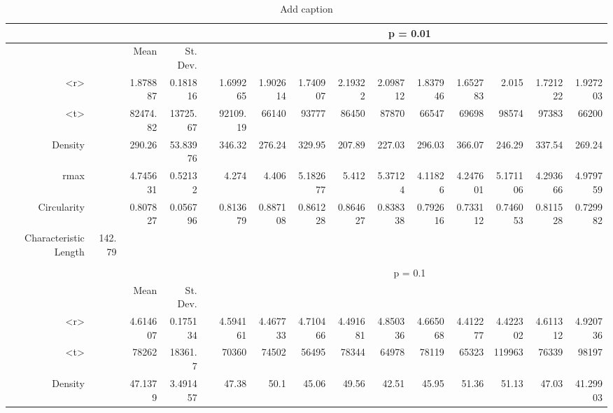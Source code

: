 \begin{table}[htbp]
  \centering
  \caption{Add caption}
    \begin{tabular}{rrrrrrrrrrrrrrr}
    \toprule
          &       &       &       &       & \multicolumn{10}{c}{p = 0.01} \\
    \midrule
          &       & Mean  & St. Dev. &       &       &       &       &       &       &       &       &       &       &  \\
    <r>   &       & 1.878887 & 0.181816 &       & 1.699265 & 1.902614 & 1.740907 & 2.19322 & 2.098712 & 1.837946 & 1.652783 & 2.015 & 1.721222 & 1.927203 \\
    <t>   &       & 82474.82 & 13725.67 &       & 92109.19 & 66140 & 93777 & 86450 & 87870 & 66547 & 69698 & 98574 & 97383 & 66200 \\
    Density &       & 290.26 & 53.83976 &       & 346.32 & 276.24 & 329.95 & 207.89 & 227.03 & 296.03 & 366.07 & 246.29 & 337.54 & 269.24 \\
    rmax  &       & 4.745631 & 0.52132 &       & 4.274 & 4.406 & 5.182677 & 5.412 & 5.37124 & 4.11826 & 4.247601 & 5.171106 & 4.293666 & 4.979759 \\
    Circularity &       & 0.807827 & 0.056796 &       & 0.813679 & 0.887108 & 0.861228 & 0.864627 & 0.838338 & 0.792616 & 0.733112 & 0.746053 & 0.811528 & 0.729982 \\
    Characteristic Length & 142.79 &       &       &       &       &       &       &       &       &       &       &       &       &  \\
          &       &       &       &       &       &       &       &       &       &       &       &       &       &  \\
          &       &       &       &       & \multicolumn{10}{c}{p = 0.1} \\
          &       & Mean  & St. Dev. &       &       &       &       &       &       &       &       &       &       &  \\
    <r>   &       & 4.614607 & 0.175134 &       & 4.594161 & 4.467733 & 4.710466 & 4.491681 & 4.850336 & 4.665068 & 4.412277 & 4.422302 & 4.611312 & 4.920736 \\
    <t>   &       & 78262 & 18361.7 &       & 70360 & 74502 & 56495 & 78344 & 64978 & 78119 & 65323 & 119963 & 76339 & 98197 \\
    Density &       & 47.1379 & 3.491457 &       & 47.38 & 50.1  & 45.06 & 49.56 & 42.51 & 45.95 & 51.36 & 51.13 & 47.03 & 41.29903 \\

\end{tabular}
\end{table}
